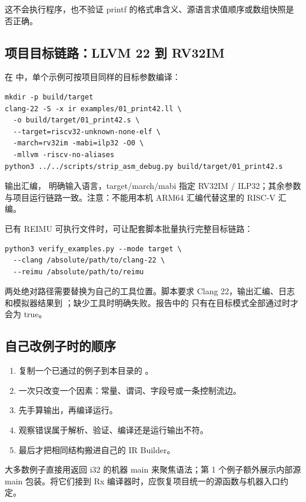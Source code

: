 这不会执行程序，也不验证 printf 的格式串含义、源语言求值顺序或数组快照是否正确。

\subsection{项目目标链路：LLVM 22 到 RV32IM}
在  中，单个示例可按项目同样的目标参数编译：
\begin{lstlisting}[language={},numbers=none]
mkdir -p build/target
clang-22 -S -x ir examples/01_print42.ll \
  -o build/target/01_print42.s \
  --target=riscv32-unknown-none-elf \
  -march=rv32im -mabi=ilp32 -O0 \
  -mllvm -riscv-no-aliases
python3 ../../scripts/strip_asm_debug.py build/target/01_print42.s
\end{lstlisting}
\code{-S} 输出汇编，\code{-x ir} 明确输入语言，target/march/mabi 指定 RV32IM / ILP32；其余参数与项目运行链路一致。注意：不能用本机 ARM64 汇编代替这里的 RISC-V 汇编。

已有 REIMU 可执行文件时，可让配套脚本批量执行完整目标链路：
\begin{lstlisting}[language={},numbers=none]
python3 verify_examples.py --mode target \
  --clang /absolute/path/to/clang-22 \
  --reimu /absolute/path/to/reimu
\end{lstlisting}
两处绝对路径需要替换为自己的工具位置。脚本要求 Clang 22，输出汇编、日志和模拟器结果到 ；缺少工具时明确失败。报告中的
只有在目标模式全部通过时才会为 true。

\subsection{自己改例子时的顺序}
\begin{enumerate}
 \item 复制一个已通过的例子到本目录的 \code{build/experiments/}。
 \item 一次只改变一个因素：常量、谓词、字段号或一条控制流边。
 \item 先手算输出，再编译运行。
 \item 观察错误属于解析、验证、编译还是运行输出不符。
 \item 最后才把相同结构搬进自己的 IR Builder。
\end{enumerate}
大多数例子直接用返回 i32 的机器 main 来聚焦语法；第 1 个例子额外展示内部源 main 包装。将它们接到 Rx 编译器时，应恢复项目统一的源函数与机器入口约定。

